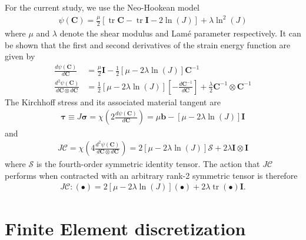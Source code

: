 \documentclass[preprint,12pt,times]{elsarticle}
\DeclareMathOperator{\trace}{tr}
\begin{document}
For the current study, we use the Neo-Hookean model
\begin{gather}
\psi \left( \mathbf{C} \right)
  = \frac{\mu}{2} \left[ \trace{\mathbf{C}} - \trace{\mathbf{I}} - 2 \ln\left( J \right) \right]
  + \lambda \ln^{2}\left( J \right)
\end{gather}
where $\mu$ and $\lambda$ denote the shear modulus and Lam\'{e} parameter respectively. It can be shown that the first and second derivatives of the strain energy function are given by
\begin{align}
\frac{d \psi \left( \mathbf{C} \right)}{d \mathbf{C}}
  &= \frac{\mu}{2} \mathbf{I} - \frac{1}{2} \left[ \mu - 2\lambda\ln\left( J \right) \right] \mathbf{C}^{-1} \\
\frac{d^{2} \psi \left( \mathbf{C} \right)}{d \mathbf{C} \otimes d \mathbf{C}}
  &= \frac{1}{2}\left[ \mu - 2\lambda\ln\left( J \right) \right] \left[ - \frac{d \mathbf{C}^{-1}}{d \mathbf{C}} \right]
  + \frac{\lambda}{2} \mathbf{C}^{-1} \otimes \mathbf{C}^{-1}
\end{align}
The Kirchhoff stress and its associated material tangent are
\begin{gather}
\boldsymbol{\tau}
  \equiv J \boldsymbol{\sigma}
  = \chi\left( 2 \frac{d \psi \left( \mathbf{C} \right)}{d \mathbf{C}} \right)
  = \mu \mathbf{b} - \left[ \mu - 2\lambda\ln\left( J \right) \right] \mathbf{I}
\end{gather}
and
\begin{gather}
J \boldsymbol{\mathcal{C}}
  = \chi\left( 4 \frac{d^{2} \psi \left( \mathbf{C} \right)}{d \mathbf{C} \otimes d \mathbf{C}} \right)
  = 2 \left[ \mu - 2\lambda\ln\left( J \right) \right] \boldsymbol{\mathcal{S}}
  + 2 \lambda \mathbf{I} \otimes \mathbf{I}
\end{gather}
where $\boldsymbol{\mathcal{S}}$ is the fourth-order symmetric identity tensor.
The action that $J \boldsymbol{\mathcal{C}}$ performs when contracted with an arbitrary rank-2 symmetric tensor is therefore
\begin{gather}
J \boldsymbol{\mathcal{C}} : \left( \bullet \right)
  = 2 \left[ \mu - 2\lambda\ln\left( J \right) \right] \left( \bullet \right)
  + 2 \lambda \trace\left( \bullet \right) \mathbf{I}.
\label{eq:simplified_action}
\end{gather}

\section{Finite Element discretization}
\label{sec:fe}
\end{document}
